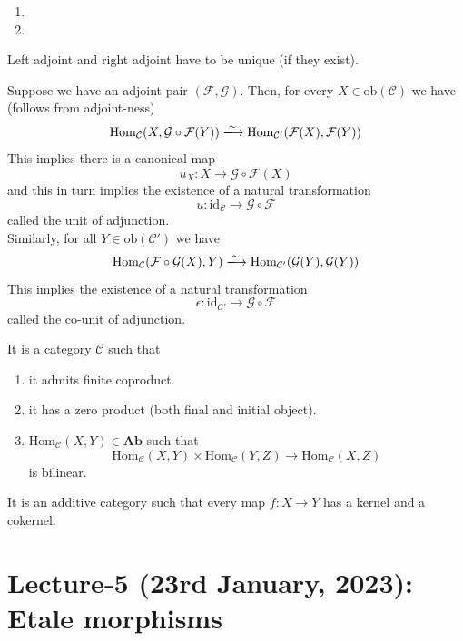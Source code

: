 \documentclass[oneside, 12pt, ]{scrbook}
\theoremstyle{theorem}
\begin{document}
\begin{example}
\begin{enumerate}
\item
\item
\end{enumerate}
\end{example}

\begin{proposition}
Left adjoint and right adjoint have to be unique (if they exist).
\end{proposition}

Suppose we have an adjoint pair $(\mathcal{F}, \mathcal{G})$. Then, for every $X \in \mathrm{ob}(\mathcal{C})$ we have (follows from adjoint-ness) $$\mathrm{Hom}_{\mathcal{C}}(X, \mathcal{G}\circ \mathcal{F}(Y)) \xlongrightarrow{\sim} \mathrm{Hom}_{\mathcal{C}'}(\mathcal{F}(X),\mathcal{F}(Y))$$
This implies there is a canonical map $$u_{X}: X \rightarrow \mathcal{G} \circ \mathcal{F}(X)$$ and this in turn implies the existence of a natural transformation $$u: \mathrm{id}_{\mathcal{C}} \rightarrow \mathcal{G} \circ \mathcal{F}$$ called the unit of adjunction. \\
Similarly, for all $Y \in \mathrm{ob}(\mathcal{C}')$ we have 
$$\mathrm{Hom}_{\mathcal{C}}(\mathcal{F}\circ \mathcal{G}(X), Y) \xlongrightarrow{\sim} \mathrm{Hom}_{\mathcal{C}'}(\mathcal{G}(Y),\mathcal{G}(Y))$$
This implies the existence of a natural transformation $$\epsilon : \mathrm{id}_{\mathcal{C}'} \rightarrow \mathcal{G} \circ \mathcal{F}$$ called the co-unit of adjunction.


\begin{definition}
It is a category $\mathcal{C}$ such that 
\begin{enumerate}
\item it admits finite coproduct.
\item it has a zero product (both final and initial object).
\item $\mathrm{Hom}_{\mathcal{C}}(X,Y) \in \mathbf{Ab}$ such that $$\mathrm{Hom}_{\mathcal{C}}(X,Y) \times \mathrm{Hom}_{\mathcal{C}}(Y,Z) \rightarrow \mathrm{Hom}_{\mathcal{C}}(X,Z)$$ is bilinear.
\end{enumerate}
\end{definition}

\begin{definition}
It is an additive category such that every map $f: X \rightarrow Y$ has a kernel and a cokernel.
\end{definition}


\chapter{Lecture-5 (23rd January, 2023): Etale morphisms}
\end{document}
